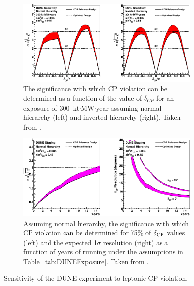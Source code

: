 \begin{figure}
  \centering
  \begin{subfigure}[t]{\linewidth}
    \centering
    \includegraphics[width=16cm]{DUNECPViolationDeltaCP.pdf}
    \caption{The significance with which CP violation can be determined as a function of the value of $\delta_{CP}$ for an exposure of 300~kt$\cdot$MW$\cdot$year assuming normal hierarchy (left) and inverted hierarchy (right).  Taken from \cite{DUNECDR2}.}
    \label{fig:DUNECPViolationDeltaCP}
  \end{subfigure}
  \hfill
  \vfill
  \begin{subfigure}[t]{\linewidth}
    \centering
    \includegraphics[width=16cm]{DUNECPViolationTime.pdf}
    \caption{Assuming normal hierarchy, the significance with which CP violation can be determined for 75\% of $\delta_{\textnormal{CP}}$ values (left) and the expected 1$\sigma$ resolution (right) as a function of years of running under the assumptions in Table~\ref{tab:DUNEExposure}.  Taken from \cite{DUNECDR1}.}
    \label{fig:DUNECPViolationTime}
  \end{subfigure}
  \caption[Sensitivity of the DUNE experiment to leptonic CP violation.]{Sensitivity of the DUNE experiment to leptonic CP violation.}
  \label{fig:DUNECPViolation}
\end{figure}

